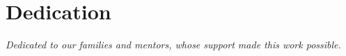 \section*{Dedication}

\begin{center}
\textit{Dedicated to our families and mentors, whose support made this work possible.}
\end{center}
